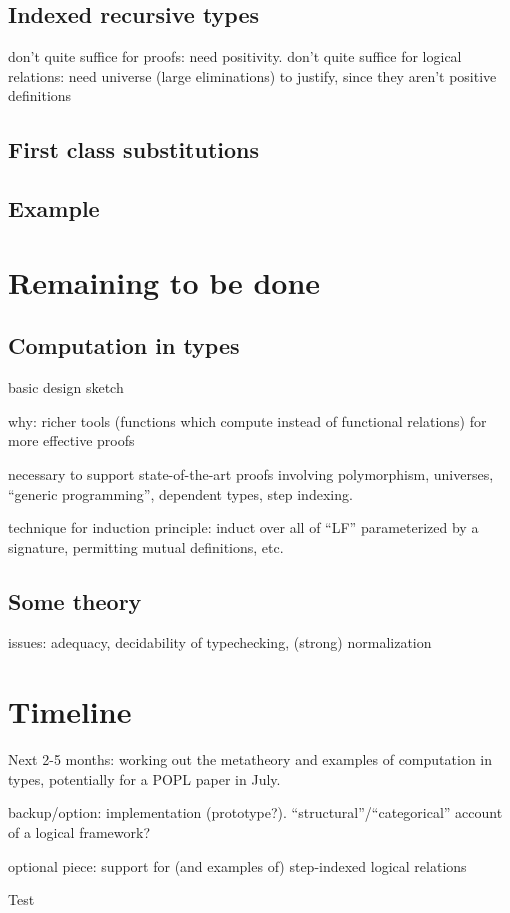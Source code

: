 \documentclass{article}
\begin{document}
\subsection{Indexed recursive types}

don't quite suffice for proofs: need positivity. don't quite suffice
for logical relations: need universe (large eliminations) to justify,
since they aren't positive definitions
\subsection{First class substitutions}

\subsection{Example}
\section{Remaining to be done}
\subsection{Computation in types}
basic design sketch

why: richer tools (functions which compute instead of functional
relations) for more effective proofs

necessary to support state-of-the-art proofs involving polymorphism,
universes, ``generic programming'', dependent types, step indexing.

technique for induction principle: induct over all of ``LF''
parameterized by a signature, permitting mutual definitions, etc.
\subsection{Some theory}

issues: adequacy, decidability of typechecking, (strong) normalization
\section{Timeline}
Next 2-5 months: working out the metatheory and examples of computation in
types, potentially for a POPL paper in July.

backup/option: implementation (prototype?). ``structural''/``categorical'' account of a logical framework?

optional piece: support for (and examples of) step-indexed logical
relations

\begin{thebibliography}
Test
\end{thebibliography}
\end{document}
